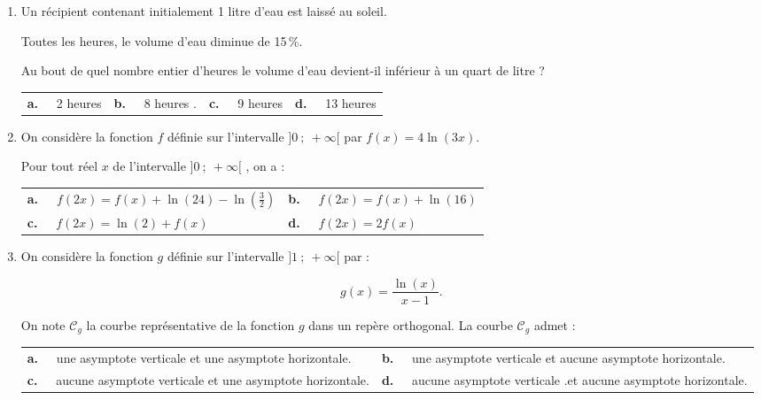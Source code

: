 \documentclass[11pt,a4paper,french]{article}
\begin{document}
\bigskip
\begin{enumerate}
\item Un récipient contenant initialement 1 litre d'eau est laissé au soleil.

Toutes les heures, le volume d'eau diminue de 15\,\%.

Au bout de quel nombre entier d'heures le volume d'eau devient-il inférieur à un quart de litre ? 

\begin{center}
\begin{tabularx}{\linewidth}{*{4}{X}}
\textbf{a.~~} 2 heures &\textbf{b.~~}  8 heures .&\textbf{c.~~}  9 heures
&\textbf{d.~~}  13 heures 
\end{tabularx}
\end{center}

\item  On considère la fonction $f$ définie sur l'intervalle $]0~;~+\infty[$ par $f(x) = 4\ln (3x)$.

Pour tout réel $x$ de l'intervalle $]0~;~+\infty[$ , on a :

\begin{center}
\begin{tabularx}{\linewidth}{*{2}{X}}
\textbf{a.~~} $f(2x) = f(x) + \ln (24) - \ln \left(\frac32\right)$&\textbf{b.~~}  $f(2x) = f(x) + \ln (16)$\\
\textbf{c.~~} $f(2x) = \ln (2) + f(x)$& \textbf{d.~~} $f(2x) = 2f(x)$
\end{tabularx}
\end{center}
\item  On considère la fonction $g$ définie sur l'intervalle $]1~;~+\infty[$ par : 

\[g(x) = \dfrac{\ln (x)}{x - 1}.\]


On note $\mathcal{C}_g$ la courbe représentative de la fonction $g$ dans un repère orthogonal. La courbe $\mathcal{C}_g$ admet :

\begin{center}
\begin{tabularx}{\linewidth}{*{2}{X}}
\textbf{a.~~} une asymptote verticale
et une asymptote horizontale.&\textbf{b.~~} une asymptote verticale
et aucune asymptote horizontale.\\
\textbf{c.~~} aucune asymptote verticale et une asymptote horizontale.&\textbf{d.~~} 
aucune asymptote verticale .et aucune asymptote horizontale.
\end{tabularx}
\end{center}
\end{enumerate}
\end{document}
